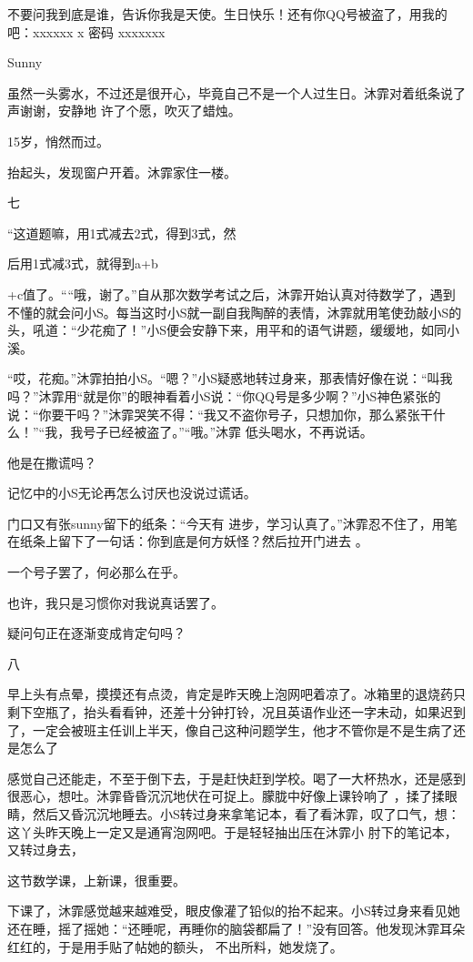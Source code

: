 \documentclass{article}
\begin{document}
不要问我到底是谁，告诉你我是天使。生日快乐！还有你QQ号被盗了，用我的吧：xxxxxx
x 密码 xxxxxxx 


Sunny 

虽然一头雾水，不过还是很开心，毕竟自己不是一个人过生日。沐霏对着纸条说了声谢谢，安静地
许了个愿，吹灭了蜡烛。 


15岁，悄然而过。 


抬起头，发现窗户开着。沐霏家住一楼。 


七 

“这道题嘛，用1式减去2式，得到3式，然

\newpage
后用1式减3式，就得到a+b 

+c值了。““哦，谢了。”自从那次数学考试之后，沐霏开始认真对待数学了，遇到不懂的就会问小S。每当这时小S就一副自我陶醉的表情，沐霏就用笔使劲敲小S的头，吼道：“少花痴了！”小S便会安静下来，用平和的语气讲题，缓缓地，如同小
溪。 

“哎，花痴。”沐霏拍拍小S。“嗯？”小S疑惑地转过身来，那表情好像在说：“叫我吗？”沐霏用“就是你”的眼神看着小S说：“你QQ号是多少啊？”小S神色紧张的说：“你要干吗？”沐霏哭笑不得：“我又不盗你号子，只想加你，那么紧张干什么！”“我，我号子已经被盗了。”“哦。”沐霏
低头喝水，不再说话。 


他是在撒谎吗？ 

记忆中的小S无论再怎么讨厌也没说过谎话。

门口又有张sunny留下的纸条：“今天有
\newpage
进步，学习认真了。”沐霏忍不住了，用笔在纸条上留下了一句话：你到底是何方妖怪？然后拉开门进去
。 


一个号子罢了，何必那么在乎。 


也许，我只是习惯你对我说真话罢了。 


疑问句正在逐渐变成肯定句吗？ 


八 

早上头有点晕，摸摸还有点烫，肯定是昨天晚上泡网吧着凉了。冰箱里的退烧药只剩下空瓶了，抬头看看钟，还差十分钟打铃，况且英语作业还一字未动，如果迟到了，一定会被班主任训上半天，像自己这种问题学生，他才不管你是不是生病了还是怎么了

感觉自己还能走，不至于倒下去，于是赶快赶到学校。喝了一大杯热水，还是感到很恶心，想吐。沐霏昏昏沉沉地伏在可捉上。朦胧中好像上课铃响了
\newpage
，揉了揉眼睛，然后又昏沉沉地睡去。小S转过身来拿笔记本，看了看沐霏，叹了口气，想：这丫头昨天晚上一定又是通宵泡网吧。于是轻轻抽出压在沐霏小
肘下的笔记本，又转过身去， 


这节数学课，上新课，很重要。 

下课了，沐霏感觉越来越难受，眼皮像灌了铅似的抬不起来。小S转过身来看见她还在睡，摇了摇她：“还睡呢，再睡你的脑袋都扁了！”没有回答。他发现沐霏耳朵红红的，于是用手贴了帖她的额头，
不出所料，她发烧了。 
\end{document}
